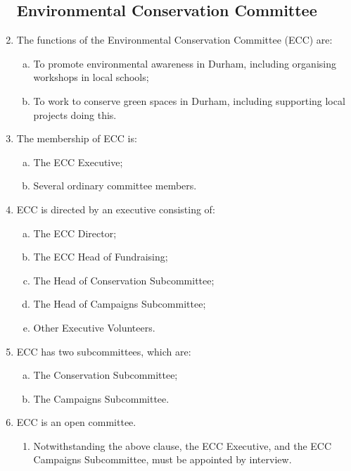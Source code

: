 \documentclass[12pt]{article}
\begin{document}
\begin{enumerate}
    \subsection{Environmental Conservation Committee}
    \item The functions of the Environmental Conservation Committee (ECC) are:
    \begin{enumerate}[(a)]
        \item To promote environmental awareness in Durham, including organising workshops in local schools;
        \item To work to conserve green spaces in Durham, including supporting local projects doing this.
    \end{enumerate}
    \item The membership of ECC is:
    \begin{enumerate}[(a)]
\item The ECC Executive;
\item Several ordinary committee members.
\end{enumerate}
\item ECC is directed by an executive consisting of:
\begin{enumerate}[(a)]
\item The ECC Director;
\item The ECC Head of Fundraising;
\item The Head of Conservation Subcommittee;
\item The Head of Campaigns Subcommittee;
\item Other Executive Volunteers.
\end{enumerate}
\item  ECC has two subcommittees, which are:
\begin{enumerate}[(a)]
\item The Conservation Subcommittee;
\item The Campaigns Subcommittee.
\end{enumerate}
\item  ECC is an open committee.
\begin{enumerate}
    \item Notwithstanding the above clause, the ECC Executive, and the ECC Campaigns Subcommittee, must be appointed by interview.
\end{enumerate}

    

\end{enumerate}
\end{document}
